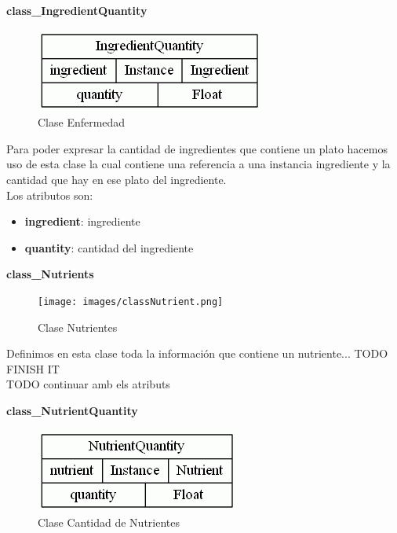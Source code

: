 \documentclass[12]{article}
\begin{document}
\vspace{0.5cm}

\textbf{class\_IngredientQuantity}
\begin{figure}[H]
\centering
\includegraphics[scale=0.5]{images/classIngredientQuantity.png}
\caption{Clase Enfermedad}
\label{cantidad_ingrediente}
\end{figure}

Para poder expresar la cantidad de ingredientes que contiene un plato hacemos uso de esta clase la cual contiene una referencia a una instancia ingrediente y la cantidad que hay en ese plato del ingrediente.
\\

Los atributos son: 
\begin{itemize}
\item \textbf{ingredient}: ingrediente
\item \textbf{quantity}: cantidad del ingrediente
\end{itemize}


\vspace{0.5cm}

\textbf{class\_Nutrients}
\begin{figure}[H]
\centering
\texttt{[image: images/classNutrient.png]}
\caption{Clase Nutrientes}
\label{nutrientes}
\end{figure}

Definimos en esta clase toda la información que contiene un nutriente... TODO FINISH IT 
\\
TODO continuar amb els atributs


\vspace{0.5cm}

\textbf{class\_NutrientQuantity}
\begin{figure}[H]
\centering
\includegraphics[scale=0.5]{images/classNutrientQuantity.png}
\caption{Clase Cantidad de Nutrientes}
\label{cantidad_nutriente}
\end{figure}
\end{document}
